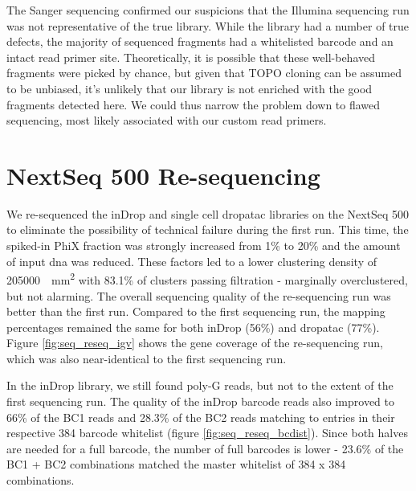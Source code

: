 The Sanger sequencing confirmed our suspicions that the Illumina sequencing run was not representative of the true library. While the library had a number of true defects, the majority of sequenced fragments had a whitelisted barcode and an intact read primer site. Theoretically, it is possible that these well-behaved fragments were picked by chance, but given that TOPO cloning can be assumed to be unbiased, it's unlikely that our library is not enriched with the good fragments detected here. We could thus narrow the problem down to flawed sequencing, most likely associated with our custom read primers.\pms

\section{NextSeq 500 Re-sequencing}


We re-sequenced the inDrop and single cell \acrshort{dropatac} libraries on the NextSeq 500 to eliminate the possibility of technical failure during the first run. This time, the spiked-in PhiX fraction was strongly increased from 1\% to 20\% and the amount of input \acrshort{dna} was reduced. These factors led to a lower clustering density of \SI{205 000}{\per\mm\squared} with 83.1\% of clusters passing filtration - marginally overclustered, but not alarming. The overall sequencing quality of the re-sequencing run was better than the first run. Compared to the first sequencing run, the mapping percentages remained the same for both inDrop (56\%) and \acrshort{dropatac} (77\%). Figure \ref{fig:seq_reseq_igv} shows the gene coverage of the re-sequencing run, which was also near-identical to the first sequencing run.\pms

In the inDrop library, we still found poly-G reads, but not to the extent of the first sequencing run. The quality of the inDrop barcode reads also improved to 66\% of the BC1 reads and 28.3\% of the BC2 reads matching to entries in their respective 384 barcode whitelist (figure \ref{fig:seq_reseq_bcdist}). Since both halves are needed for a full barcode, the number of full barcodes is lower - 23.6\% of the BC1 + BC2 combinations matched the master whitelist of 384 x 384 combinations.\pms

